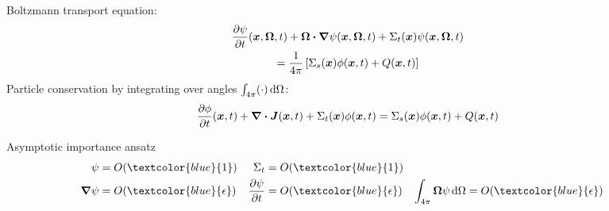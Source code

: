 \documentclass{beamer}
\begin{document}
\begin{frame}
  Boltzmann transport equation:
  \begin{multline} \label{eq:shortBoltzmannTd}
    \frac{\partial \psi}{\partial t}(\bm{x}, \bm{\Omega}, t) + \bm{\Omega} \bm{\cdot} \bm{\nabla}
    \psi(\bm{x}, \bm{\Omega}, t) + \Sigma_t (\bm{x}) \psi(\bm{x},
    \bm{\Omega}, t) \\ =
    \frac{1}{4\pi} \left[ \Sigma_s (\bm{x}) \phi(\bm{x}, t) + Q(\bm{x}, t) \right]
  \end{multline}
  Particle conservation by integrating over angles $\int_{4\pi} (\cdot) \mathop{}\!\mathrm{d}
  \Omega$:
  \begin{equation} \label{eq:shortConservationTd}
    \frac{\partial \phi}{\partial t}(\bm{x}, t) + \bm{\nabla} \bm{\cdot} \bm{J}(\bm{x}, t)
    + \Sigma_t (\bm{x}) \phi(\bm{x}, t) =
   \Sigma_s (\bm{x}) \phi(\bm{x}, t) + Q(\bm{x}, t)
  \end{equation}

  \begin{block}{Asymptotic importance ansatz}
    \begin{align*}
      \psi &= O(\textcolor{blue}{1}) & \Sigma_t &= O(\textcolor{blue}{1}) \\
      \del \psi &= O(\textcolor{blue}{\epsilon}) &
      \pder{\psi}{t} &= O(\textcolor{blue}{\epsilon}) &
      \int_{4\pi} \vec{\Omega} \psi\ud \Omega &= O(\textcolor{blue}{\epsilon})
    \end{align*}
  \end{block}
\end{frame}
\end{document}
